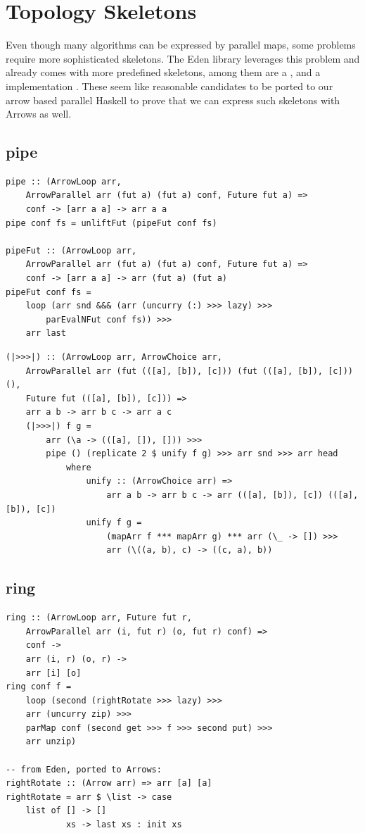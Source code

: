\section{Topology Skeletons}
Even though many algorithms can be expressed by parallel maps, some problems require more sophisticated skeletons. The Eden library leverages this problem and already comes with more predefined skeletons, among them are a ,  and a  implementation \cite{eden_cefp, eden_skel_topology}. These seem like reasonable candidates to be ported to our arrow based parallel Haskell to prove that we can express such skeletons with Arrows as well.

\subsection{pipe}

\begin{lstlisting}[frame=htrbl]
pipe :: (ArrowLoop arr,
	ArrowParallel arr (fut a) (fut a) conf, Future fut a) =>
	conf -> [arr a a] -> arr a a
pipe conf fs = unliftFut (pipeFut conf fs)

pipeFut :: (ArrowLoop arr,
	ArrowParallel arr (fut a) (fut a) conf, Future fut a) =>
	conf -> [arr a a] -> arr (fut a) (fut a)
pipeFut conf fs =
	loop (arr snd &&& (arr (uncurry (:) >>> lazy) >>>
		parEvalNFut conf fs)) >>>
	arr last
\end{lstlisting}

\begin{lstlisting}[frame=htrbl]
(|>>>|) :: (ArrowLoop arr, ArrowChoice arr,
	ArrowParallel arr (fut (([a], [b]), [c])) (fut (([a], [b]), [c])) (),
	Future fut (([a], [b]), [c])) =>
	arr a b -> arr b c -> arr a c
	(|>>>|) f g =
		arr (\a -> (([a], []), [])) >>>
		pipe () (replicate 2 $ unify f g) >>> arr snd >>> arr head
			where
				unify :: (ArrowChoice arr) =>
					arr a b -> arr b c -> arr (([a], [b]), [c]) (([a], [b]), [c])
				unify f g =
					(mapArr f *** mapArr g) *** arr (\_ -> []) >>>
					arr (\((a, b), c) -> ((c, a), b))
\end{lstlisting}

\subsection{ring}

\begin{lstlisting}[frame=htrbl]
ring :: (ArrowLoop arr, Future fut r,
	ArrowParallel arr (i, fut r) (o, fut r) conf) =>
    conf ->
    arr (i, r) (o, r) ->
    arr [i] [o]
ring conf f =
	loop (second (rightRotate >>> lazy) >>>
    arr (uncurry zip) >>>
    parMap conf (second get >>> f >>> second put) >>>
    arr unzip)

-- from Eden, ported to Arrows:
rightRotate :: (Arrow arr) => arr [a] [a]
rightRotate = arr $ \list -> case
	list of [] -> []
			xs -> last xs : init xs
\end{lstlisting}

